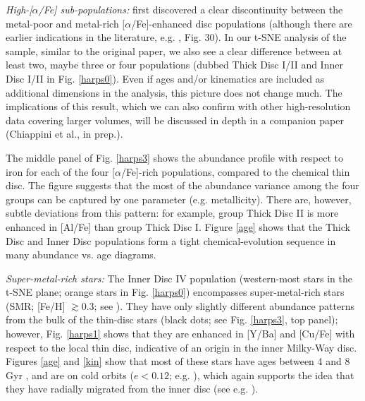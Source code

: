 \documentclass{aa}  %
\begin{document}
{\it High-[$\alpha$/Fe] sub-populations:} \citet{Adibekyan2011} first discovered a clear discontinuity between the metal-poor and metal-rich $[\alpha$/Fe]-enhanced disc populations (although there are earlier indications in the literature, e.g. \citealt{Fuhrmann2008}, Fig. 30). In our t-SNE analysis of the \citet{DelgadoMena2017} sample, similar to the original paper, we also see a clear difference between at least two, maybe three or four populations (dubbed Thick Disc I/II and Inner Disc I/II in Fig. \ref{harps0}). Even if ages and/or kinematics are included as additional dimensions in the analysis, this picture does not change much. The implications of this result, which we can also confirm with other high-resolution data covering larger volumes, will be discussed in depth in a companion paper (Chiappini et al., in prep.).

The middle panel of Fig. \ref{harps3} shows the abundance profile with respect to iron for each of the four [$\alpha$/Fe]-rich populations, compared to the chemical thin disc. The figure suggests that the most of the abundance variance among the four groups can be captured by one parameter (e.g. metallicity). There are, however, subtle deviations from this pattern: for example, group Thick Disc II is more enhanced in [Al/Fe] than group Thick Disc I. Figure \ref{age} shows that the Thick Disc and Inner Disc populations form a tight chemical-evolution sequence in many abundance vs. age diagrams. 

{\it Super-metal-rich stars:} The Inner Disc IV population (western-most stars in the t-SNE plane; orange stars in Fig. \ref{harps0}) encompasses super-metal-rich stars (SMR; [Fe/H] $\gtrsim0.3$; see \citealt{Grenon1972, Grenon1989, Grenon1999, Chiappini2009}). They have only slightly different abundance patterns from the bulk of the thin-disc stars (black dots; see Fig. \ref{harps3}, top panel); however, Fig. \ref{harps1} shows that they are enhanced in [Y/Ba] and [Cu/Fe] with respect to the local thin disc, indicative of an origin in the inner Milky-Way disc. Figures \ref{age} and \ref{kin} show that most of these stars have ages between 4 and 8 Gyr \citep{Trevisan2011, Casagrande2011, Anders2017}, and are on cold orbits ($e<0.12$; e.g. \citealt{Kordopatis2015}), which again supports the idea that they have radially migrated from the inner disc (see e.g. \citealt{Minchev2012, Minchev2013, Minchev2014, Vera-Ciro2014, Grand2016}).
\end{document}
